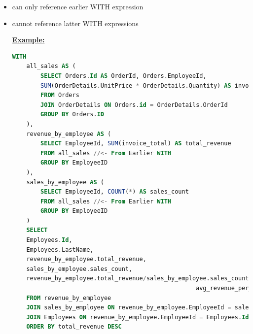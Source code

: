 \documentclass[12pt]{article}
\begin{document}
\begin{itemize}
    \item can only reference earlier WITH expression
    \item cannot reference latter WITH expressions

    \bigskip

    \underline{\textbf{Example:}}

    \bigskip

    \begin{lstlisting}[language=SQL]
    WITH
    all_sales AS (
        SELECT Orders.Id AS OrderId, Orders.EmployeeId,
        SUM(OrderDetails.UnitPrice * OrderDetails.Quantity) AS invoice_total
        FROM Orders
        JOIN OrderDetails ON Orders.id = OrderDetails.OrderId
        GROUP BY Orders.ID
    ),
    revenue_by_employee AS (
        SELECT EmployeeId, SUM(invoice_total) AS total_revenue
        FROM all_sales //<- From Earlier WITH
        GROUP BY EmployeeID
    ),
    sales_by_employee AS (
        SELECT EmployeeId, COUNT(*) AS sales_count
        FROM all_sales //<- From Earlier WITH
        GROUP BY EmployeeID
    )
    SELECT
    Employees.Id,
    Employees.LastName,
    revenue_by_employee.total_revenue,
    sales_by_employee.sales_count,
    revenue_by_employee.total_revenue/sales_by_employee.sales_count AS
                                                    avg_revenue_per_sale
    FROM revenue_by_employee
    JOIN sales_by_employee ON revenue_by_employee.EmployeeId = sales_by_employee.EmployeeId
    JOIN Employees ON revenue_by_employee.EmployeeId = Employees.Id
    ORDER BY total_revenue DESC
    \end{lstlisting}

\end{itemize}
\end{document}
